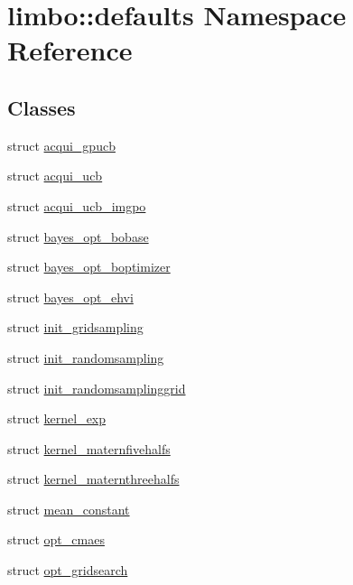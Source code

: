 \hypertarget{namespacelimbo_1_1defaults}{}\section{limbo\+:\+:defaults Namespace Reference}
\label{namespacelimbo_1_1defaults}
\subsection*{Classes}
\begin{DoxyCompactItemize}
\item 
struct \hyperlink{structlimbo_1_1defaults_1_1acqui__gpucb}{acqui\+\_\+gpucb}
\item 
struct \hyperlink{structlimbo_1_1defaults_1_1acqui__ucb}{acqui\+\_\+ucb}
\item 
struct \hyperlink{structlimbo_1_1defaults_1_1acqui__ucb__imgpo}{acqui\+\_\+ucb\+\_\+imgpo}
\item 
struct \hyperlink{structlimbo_1_1defaults_1_1bayes__opt__bobase}{bayes\+\_\+opt\+\_\+bobase}
\item 
struct \hyperlink{structlimbo_1_1defaults_1_1bayes__opt__boptimizer}{bayes\+\_\+opt\+\_\+boptimizer}
\item 
struct \hyperlink{structlimbo_1_1defaults_1_1bayes__opt__ehvi}{bayes\+\_\+opt\+\_\+ehvi}
\item 
struct \hyperlink{structlimbo_1_1defaults_1_1init__gridsampling}{init\+\_\+gridsampling}
\item 
struct \hyperlink{structlimbo_1_1defaults_1_1init__randomsampling}{init\+\_\+randomsampling}
\item 
struct \hyperlink{structlimbo_1_1defaults_1_1init__randomsamplinggrid}{init\+\_\+randomsamplinggrid}
\item 
struct \hyperlink{structlimbo_1_1defaults_1_1kernel__exp}{kernel\+\_\+exp}
\item 
struct \hyperlink{structlimbo_1_1defaults_1_1kernel__maternfivehalfs}{kernel\+\_\+maternfivehalfs}
\item 
struct \hyperlink{structlimbo_1_1defaults_1_1kernel__maternthreehalfs}{kernel\+\_\+maternthreehalfs}
\item 
struct \hyperlink{structlimbo_1_1defaults_1_1mean__constant}{mean\+\_\+constant}
\item 
struct \hyperlink{structlimbo_1_1defaults_1_1opt__cmaes}{opt\+\_\+cmaes}
\item 
struct \hyperlink{structlimbo_1_1defaults_1_1opt__gridsearch}{opt\+\_\+gridsearch}

\end{DoxyCompactItemize}
